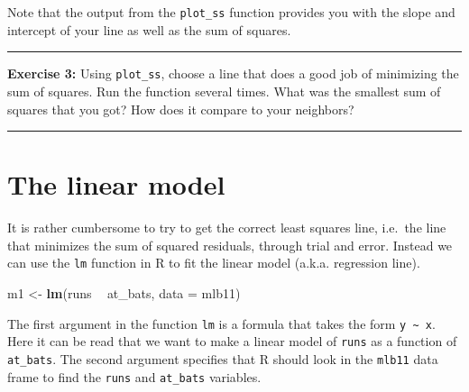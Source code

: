 \documentclass[]{book}
\newenvironment{Shaded}{\begin{snugshade}}{\end{snugshade}}
\newcommand{\DataTypeTok}[1]{\textcolor[rgb]{0.13,0.29,0.53}{#1}}
\newcommand{\KeywordTok}[1]{\textcolor[rgb]{0.13,0.29,0.53}{\textbf{#1}}}
\newcommand{\NormalTok}[1]{#1}
\newcommand{\OperatorTok}[1]{\textcolor[rgb]{0.81,0.36,0.00}{\textbf{#1}}}
\newcommand{\OtherTok}[1]{\textcolor[rgb]{0.56,0.35,0.01}{#1}}
\newcommand{\StringTok}[1]{\textcolor[rgb]{0.31,0.60,0.02}{#1}}
\theoremstyle{definition}
\theoremstyle{definition}
\theoremstyle{definition}
\theoremstyle{remark}
\begin{document}
\begin{Shaded}
\end{Shaded}

Note that the output from the \texttt{plot\_ss} function provides you
with the slope and intercept of your line as well as the sum of squares.

\begin{center}\rule{0.5\linewidth}{\linethickness}\end{center}

\textbf{Exercise 3:} Using \texttt{plot\_ss}, choose a line that does a
good job of minimizing the sum of squares. Run the function several
times. What was the smallest sum of squares that you got? How does it
compare to your neighbors?

\begin{center}\rule{0.5\linewidth}{\linethickness}\end{center}

\hypertarget{the-linear-model}{%
\section{The linear model}\label{the-linear-model}}

It is rather cumbersome to try to get the correct least squares line,
i.e.~the line that minimizes the sum of squared residuals, through trial
and error. Instead we can use the \texttt{lm} function in R to fit the
linear model (a.k.a. regression line).

\begin{Shaded}
\begin{Highlighting}[]
\NormalTok{m1 <-}\StringTok{ }\KeywordTok{lm}\NormalTok{(runs }\OperatorTok{~}\StringTok{ }\NormalTok{at_bats, }\DataTypeTok{data =}\NormalTok{ mlb11)}
\end{Highlighting}
\end{Shaded}

The first argument in the function \texttt{lm} is a formula that takes
the form \texttt{y\ \textasciitilde{}\ x}. Here it can be read that we
want to make a linear model of \texttt{runs} as a function of
\texttt{at\_bats}. The second argument specifies that R should look in
the \texttt{mlb11} data frame to find the \texttt{runs} and
\texttt{at\_bats} variables.
\end{document}
